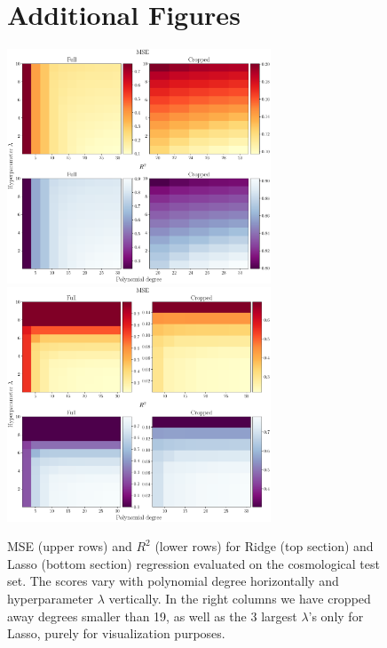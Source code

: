\documentclass[aps,pra,english,notitlepage,reprint,nofootinbib]{revtex4-1}  %
\begin{document}
\begin{figure}
  \vspace*{-5pt}
  \section{Additional Figures}\label{appsec:figures}
  \vspace*{-5pt}
  \centering %
  \includegraphics[trim = 0 0.75cm 0 0,clip,width=0.7\textwidth,keepaspectratio]{../figs/g_MSE_R2_Ridge.pdf}
  \centering
  \includegraphics[width=0.7\textwidth]{../figs/g_MSE_R2_Lasso.pdf}
  \caption{MSE (upper rows) and $R^2$ (lower rows) for Ridge (top section) and Lasso (bottom section) regression evaluated on the cosmological test set. The scores vary with polynomial degree horizontally and hyperparameter $\lambda$ vertically. In the right columns we have cropped away degrees smaller than 19, as well as the 3 largest $\lambda$'s only for Lasso, purely for visualization purposes.}\label{appfig:g MSE R2}
  \vspace*{-5pt}
\end{figure}
\end{document}
